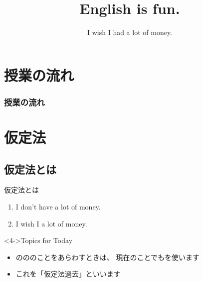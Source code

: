 \documentclass[aspectratio=169,xcolor={dvipsnames,table}]{beamer}
\title{English is fun.}
\subtitle{I wish I had a lot of money.}
\author{}
\institute[]{}
\date[]
\begin{document}
\begin{frame}[plain]
  \titlepage
\end{frame}

\section*{授業の流れ}
\begin{frame}[plain]
  \frametitle{授業の流れ}
  \tableofcontents
\end{frame}

\section{仮定法}
\subsection{仮定法とは}
\begin{frame}[plain]{仮定法とは}
 \large

\begin{enumerate}
 \item<1-> I don't have a lot of money.
 \item<2-> I wish I  a lot of money.\hfill{}
\end{enumerate}

\vfill

\begin{block}<4->{Topics for Today}
\small

\begin{itemize}
 \item {}のののことをあらわすときは、
現在のことでもを使います
 \item これを「仮定法過去」といいます
\end{itemize}
\end{block}

\mbox{}\hfill{} 
\end{frame}
\end{document}

